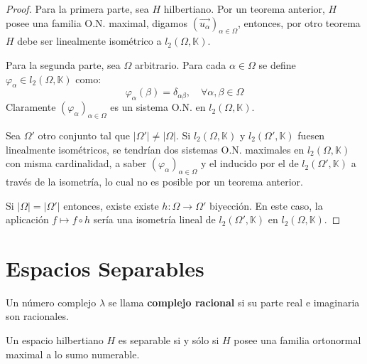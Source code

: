 \documentclass[12pt]{report}
\theoremstyle{largebreak}
\newcommand\cf[3]{\ensuremath{#1:#2\rightarrow#3}}
\newcommand\abs[1]{\ensuremath{\big|#1\big|}}
\begin{document}
    \begin{proof}
        Para la primera parte, sea $H$ hilbertiano. Por un teorema anterior, $H$ posee una familia O.N. maximal, digamos $\left(\vec{u_\alpha} \right)_{\alpha\in\Omega}$, entonces, por otro teorema $H$ debe ser linealmente isométrico a $l_2(\Omega,\mathbb{K})$.

        Para la segunda parte, sea $\Omega$ arbitrario. Para cada $\alpha\in\Omega$ se define $\varphi_\alpha\in l_2(\Omega,\mathbb{K})$ como:
        \begin{equation*}
            \varphi_{\alpha}(\beta)=\delta_{\alpha\beta},\quad\forall\alpha,\beta\in\Omega
        \end{equation*}
        Claramente $\left(\varphi_\alpha \right)_{\alpha\in\Omega}$ es un sistema O.N. en $l_2(\Omega,\mathbb{K})$.

        Sea $\Omega'$ otro conjunto tal que $\abs{\Omega'}\neq\abs{\Omega}$. Si $l_2(\Omega,\mathbb{K})$ y $l_2(\Omega',\mathbb{K})$ fuesen linealmente isométricos, se tendrían dos sistemas O.N. maximales en $l_2(\Omega,\mathbb{K})$ con misma cardinalidad, a saber $\left(\varphi_\alpha \right)_{\alpha\in\Omega}$ y el inducido por el de $l_2(\Omega',\mathbb{K})$ a través de la isometría, lo cual no es posible por un teorema anterior.

        Si $\abs{\Omega}=\abs{\Omega'}$ entonces, existe existe $\cf{h}{\Omega}{\Omega'}$ biyección. En este caso, la aplicación $f\mapsto f\circ h$ sería una isometría lineal de $l_2(\Omega',\mathbb{K})$ en $l_2(\Omega,\mathbb{K})$.
    \end{proof}

    \section{Espacios Separables}

    \begin{mydef}
        Un número complejo $\lambda$ se llama \textbf{complejo racional} si su parte real e imaginaria son racionales.
    \end{mydef}

    \begin{theor}
        Un espacio hilbertiano $H$ es separable si y sólo si $H$ posee una familia ortonormal maximal a lo sumo numerable.
    \end{theor}
\end{document}
